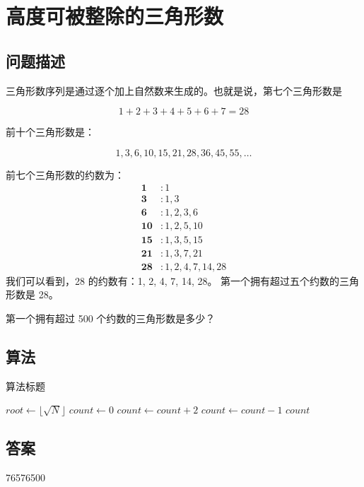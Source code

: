 \section{高度可被整除的三角形数}\label{sec:problem12}
\subsection{问题描述}
\begin{tcolorbox}
	三角形数序列是通过逐个加上自然数来生成的。也就是说，第七个三角形数是

	\[
		1 + 2 + 3 + 4 + 5 + 6 + 7 = 28
	\]

	前十个三角形数是：

	\[
		1, 3, 6, 10, 15, 21, 28, 36, 45, 55, \ldots
	\]


	前七个三角形数的约数为：
	\begin{align*}
		\mathbf 1   & \colon 1             \\
		\mathbf 3   & \colon 1,3           \\
		\mathbf 6   & \colon 1,2,3,6       \\
		\mathbf{10} & \colon 1,2,5,10      \\
		\mathbf{15} & \colon 1,3,5,15      \\
		\mathbf{21} & \colon 1,3,7,21      \\
		\mathbf{28} & \colon 1,2,4,7,14,28
	\end{align*}
	我们可以看到，28 的约数有：1, 2, 4, 7, 14, 28。
	第一个拥有超过五个约数的三角形数是 28。

	第一个拥有超过 500 个约数的三角形数是多少？
\end{tcolorbox}

\subsection{算法}
\begin{algorithm}[H]
	\caption{算法标题}
	\begin{algorithmic}[1]
	\State $root \gets \lfloor \sqrt{N} \rfloor$
	\State $ count \gets 0$
	\State $count \gets count + 2$
	\EndFor
	\State $count \gets count - 1$
	\EndIf
	\Return $count$
	\EndFunction
	\end{algorithmic}
\end{algorithm}

\subsection{答案}
76576500
